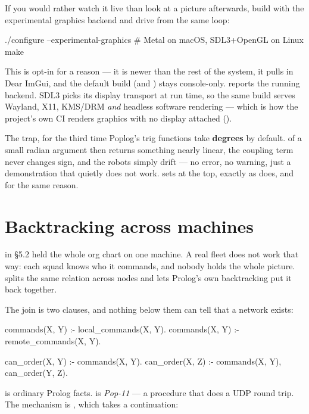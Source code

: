 If you would rather watch it live than look at a picture afterwards, build
with the experimental graphics backend and drive  from the
same loop:

\begin{sh}
./configure --experimental-graphics      # Metal on macOS, SDL3+OpenGL on Linux
make
\end{sh}

This is opt-in for a reason --- it is newer than the rest of the system, it
pulls in Dear ImGui, and the default build (and )
stays console-only.  reports the running backend. SDL3
picks its display transport at run time, so the same build serves Wayland,
X11, KMS/DRM \emph{and} headless software rendering --- which is how the
project's own CI renders graphics with no display attached
().

\begin{callout}{The trap, for the third time}
Poplog's trig functions take \textbf{degrees} by default.  of a
small radian argument then returns something nearly linear, the coupling
term never changes sign, and the robots simply drift --- no error, no
warning, just a demonstration that quietly does not work. 
sets  at the top, exactly as
 does, and for the same reason.
\end{callout}

\section{Backtracking across machines}

 in \S5.2 held the whole org chart on one machine. A real
fleet does not work that way: each squad knows who it commands, and nobody
holds the whole picture.  splits the same relation across
nodes and lets Prolog's own backtracking put it back together.

The join is two clauses, and nothing below them can tell that a network
exists:

\begin{pop}
commands(X, Y) :- local_commands(X, Y).
commands(X, Y) :- remote_commands(X, Y).

can_order(X, Y) :- commands(X, Y).
can_order(X, Z) :- commands(X, Y), can_order(Y, Z).
\end{pop}

 is ordinary Prolog facts. 
is \emph{Pop-11} --- a procedure that does a UDP round trip. The mechanism is
, which takes a continuation:

